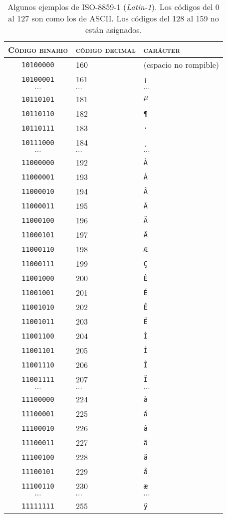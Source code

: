 \begin{table} \begin{center} \begin{tabular}{c|l|l} \hline\hline \textsc{Código binario} &\textsc{código decimal} &\textsc{carácter} \\ \hline

\texttt{10100000} &160 &(espacio no rompible) \\ \texttt{10100001} &161 &\texttt{¡} \\ $\cdots$ &$\cdots$ &$\cdots$ \\ \texttt{10110101} &181 &$\mathtt{\mu}$ \\ \texttt{10110110} &182 &\texttt{¶} \\ \texttt{10110111} &183 &\texttt{·} \\ \texttt{10111000} &184 &\texttt{¸} \\ $\cdots$ &$\cdots$ &$\cdots$ \\ \texttt{11000000} &192 &\texttt{À} \\ \texttt{11000001} &193 &\texttt{Á} \\ \texttt{11000010} &194 &\texttt{Â} \\ \texttt{11000011} &195 &\texttt{Ã} \\ \texttt{11000100} &196 &\texttt{Ä} \\ \texttt{11000101} &197 &\texttt{Å} \\ \texttt{11000110} &198 &\texttt{Æ} \\ \texttt{11000111} &199 &\texttt{Ç} \\ \texttt{11001000} &200 &\texttt{È} \\ \texttt{11001001} &201 &\texttt{É} \\ \texttt{11001010} &202 &\texttt{Ê} \\ \texttt{11001011} &203 &\texttt{Ë} \\ \texttt{11001100} &204 &\texttt{Ì} \\ \texttt{11001101} &205 &\texttt{Í} \\ \texttt{11001110} &206 &\texttt{Î} \\ \texttt{11001111} &207 &\texttt{Ï} \\ $\cdots$ &$\cdots$ &$\cdots$ \\ \texttt{11100000} &224 &\texttt{à} \\ \texttt{11100001} &225 &\texttt{á} \\ \texttt{11100010} &226 &\texttt{â} \\ \texttt{11100011} &227 &\texttt{ã} \\ \texttt{11100100} &228 &\texttt{ä} \\ \texttt{11100101} &229 &\texttt{å} \\ \texttt{11100110} &230 &\texttt{æ} \\ $\cdots$ &$\cdots$ &$\cdots$ \\ \texttt{11111111} &255 &\texttt{ÿ} \\ \end{tabular} \end{center} \caption{Algunos ejemplos de ISO-8859-1 (\emph{Latin-1}). Los códigos del 0 al 127 son como los de ASCII. Los códigos del 128 al 159 no están asignados.} \label{tb:ISO88591} \end{table} 

